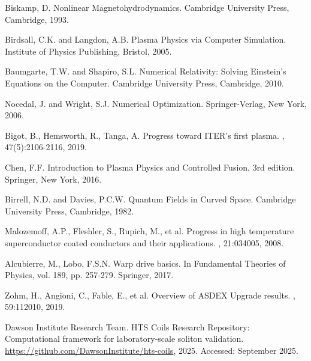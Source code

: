 \documentclass[12pt,a4paper]{article}
\begin{document}
\begin{thebibliography}{99}
Biskamp, D.
\newblock Nonlinear Magnetohydrodynamics.
\newblock Cambridge University Press, Cambridge, 1993.

Birdsall, C.K. and Langdon, A.B.
\newblock Plasma Physics via Computer Simulation.
\newblock Institute of Physics Publishing, Bristol, 2005.

Baumgarte, T.W. and Shapiro, S.L.
\newblock Numerical Relativity: Solving Einstein's Equations on the Computer.
\newblock Cambridge University Press, Cambridge, 2010.

Nocedal, J. and Wright, S.J.
\newblock Numerical Optimization.
\newblock Springer-Verlag, New York, 2006.

Bigot, B., Hemsworth, R., Tanga, A.
\newblock Progress toward ITER's first plasma.
, 47(5):2106-2116, 2019.

Chen, F.F.
\newblock Introduction to Plasma Physics and Controlled Fusion, 3rd edition.
\newblock Springer, New York, 2016.

Birrell, N.D. and Davies, P.C.W.
\newblock Quantum Fields in Curved Space.
\newblock Cambridge University Press, Cambridge, 1982.

Malozemoff, A.P., Fleshler, S., Rupich, M., et al.
\newblock Progress in high temperature superconductor coated conductors and their applications.
, 21:034005, 2008.

Alcubierre, M., Lobo, F.S.N.
\newblock Warp drive basics.
\newblock In Fundamental Theories of Physics, vol. 189, pp. 257-279. Springer, 2017.

Zohm, H., Angioni, C., Fable, E., et al.
\newblock Overview of ASDEX Upgrade results.
, 59:112010, 2019.

Dawson Institute Research Team.
\newblock HTS Coils Research Repository: Computational framework for laboratory-scale soliton validation.
\newblock \url{https://github.com/DawsonInstitute/hts-coils}, 2025.
\newblock Accessed: September 2025.

\end{thebibliography}

\appendix
\end{document}

